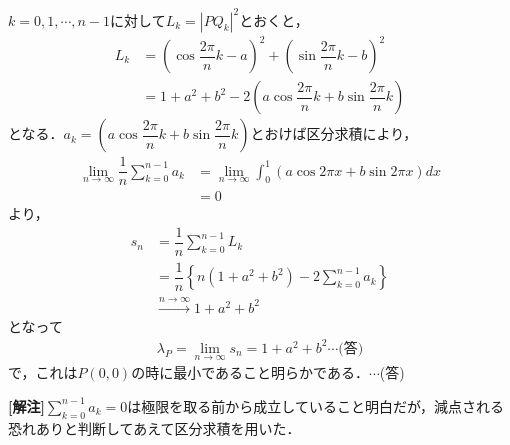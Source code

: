 \documentclass[../../main.tex]{subfiles}
\begin{document}
$k=0,1,\cdots,n-1$に対して$L_k=|PQ_k|^2$とおくと，
\begin{align}
  L_k
  &=\left(\cos\dfrac{2\pi}{n}k-a\right)^2+\left(\sin\dfrac{2\pi}{n}k-b\right)^2  \\
  &=1+a^2+b^2-2\left(a\cos\dfrac{2\pi}{n}k+b\sin\dfrac{2\pi}{n}k\right)
\end{align}
となる．$a_k=\left(a\cos\dfrac{2\pi}{n}k+b\sin\dfrac{2\pi}{n}k\right)$とおけば区分求積により，
\begin{align}
  \lim_{n\to\infty}\dfrac{1}{n}\sum_{k=0}^{n-1}a_k
  &=\lim_{n\to\infty}\int_0^1\left(a\cos2\pi x+b\sin2\pi x\right)dx \\
  &=0
\end{align}
より，
\begin{align}
  s_n&=\dfrac{1}{n}\sum_{k=0}^{n-1}L_k \\
  &=\dfrac{1}{n}\left\{n(1+a^2+b^2)-2\sum_{k=0}^{n-1}a_k\right\} \\
  &\xrightarrow{n\to\infty}1+a^2+b^2
\end{align}
となって
\begin{align}
  \lambda_P=\lim_{n\to\infty}s_n=1+a^2+b^2\cdots\text{(答)}
\end{align}
で，これは$P(0,0)$の時に最小であること明らかである．$\cdots$(答)

{\bf[解注]}$\sum_{k=0}^{n-1}a_k=0$は極限を取る前から成立していること明白だが，減点される恐れありと判断してあえて区分求積を用いた．
\newpage
\end{document}
